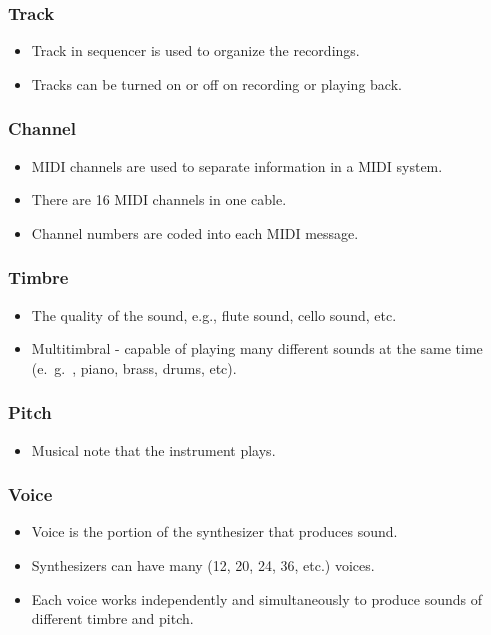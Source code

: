 \subsubsection*{Track}	
	\begin{itemize}
		\item Track in sequencer is used to organize the recordings.
		\item Tracks can be turned on or off on recording or playing back. 
	\end{itemize}
	
\subsubsection*{Channel}
	\begin{itemize}
		\item MIDI channels are used to separate information in a MIDI system.
		\item There are 16 MIDI channels in one cable.
		\item Channel numbers are coded into each MIDI message. 
	\end{itemize}
	
\subsubsection*{Timbre}
	\begin{itemize}
		\item The quality of the sound, e.g., flute sound, cello sound, etc.
		\item Multitimbral - capable of playing many different sounds at the same time (e.\ g.\ , piano, brass, drums, etc).
	\end{itemize}
	
\subsubsection*{Pitch}
	\begin{itemize}
		\item Musical note that the instrument plays. 
	\end{itemize}
		
\subsubsection*{Voice}
	\begin{itemize}
		\item Voice is the portion of the synthesizer that produces sound.
		\item Synthesizers can have many (12, 20, 24, 36, etc.) voices.
		\item Each voice works independently and simultaneously to produce sounds of different timbre and pitch.
	\end{itemize}
		
